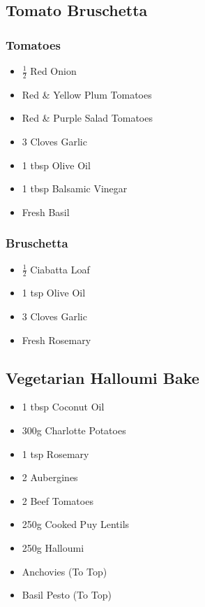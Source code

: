 \documentclass[11pt, english]{article}
\begin{document}
\newpage

	\subsection{Tomato Bruschetta}

		\subsubsection*{Tomatoes}

	\begin{itemize}
        \setlength\itemsep{0cm}
		\item $\frac{1}{2}$ Red Onion
		\item Red \& Yellow Plum Tomatoes
		\item Red \& Purple Salad Tomatoes
		\item 3 Cloves Garlic
		\item 1 tbsp Olive Oil
		\item 1 tbsp Balsamic Vinegar
		\item Fresh Basil
        \end{itemize}

		\subsubsection*{Bruschetta}

	\begin{itemize}
        \setlength\itemsep{0cm}
		\item $\frac{1}{2}$ Ciabatta Loaf
		\item 1 tsp Olive Oil
		\item 3 Cloves Garlic
		\item Fresh Rosemary
        \end{itemize}

\newpage

	\subsection{Vegetarian Halloumi Bake}

	\begin{itemize}
        \setlength\itemsep{0cm}
                \item 1 tbsp Coconut Oil
		\item 300g Charlotte Potatoes
		\item 1 tsp Rosemary
		\item 2 Aubergines
		\item 2 Beef Tomatoes
		\item 250g Cooked Puy Lentils
		\item 250g Halloumi
		\item Anchovies (To Top)
		\item Basil Pesto (To Top)
        \end{itemize}
\end{document}
